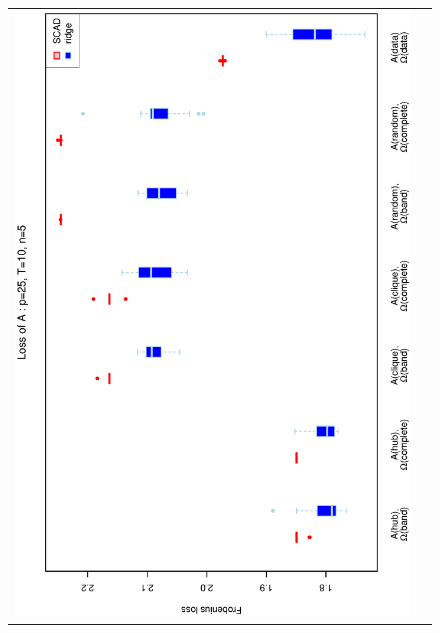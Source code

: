 \documentclass[a4paper]{article}
\begin{document}
\begin{figure}[h!]
\centering
\begin{tabular}{cc}
\includegraphics[scale=0.45,angle=270]{LossA25T10N5_5.eps}
\\

\end{tabular}
\end{figure}
\end{document}
